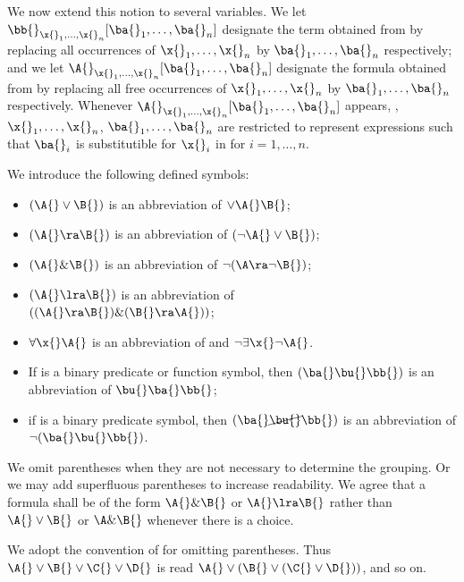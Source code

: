 We now extend this notion to several variables.
We let $\bb{}_{\x{}_1, \dots, \x{}_n} [\ba{}_1, \dots, \ba{}_n]$ designate the term obtained from \bb{} by replacing all occurrences of $\x{}_1, \dots, \x{}_n$ by $\ba{}_1, \dots, \ba{}_n$ respectively;
and we let $\A{}_{\x{}_1, \dots, \x{}_n} [\ba{}_1, \dots, \ba{}_n]$ designate the formula obtained from \A{} by replacing all free occurrences of $\x{}_1, \dots, \x{}_n$ by $\ba{}_1, \dots, \ba{}_n$ respectively.
Whenever $\A{}_{\x{}_1, \dots, \x{}_n} [\ba{}_1, \dots, \ba{}_n]$ appears, \A{}, $\x{}_1, \dots, \x{}_n$, $\ba{}_1, \dots, \ba{}_n$ are restricted to represent expressions such that $\ba{}_i$ is substitutible for $\x{}_i$ in \A{} for $i = 1, \dots, n$.

\begin{shaded*}
    We introduce the following defined symbols:
    \begin{itemize}
        \item $(\A{} \vee \B{})$ is an abbreviation of $\vee \A{} \B{}$;
        \item $(\A{} \ra \B{})$ is an abbreviation of $(\neg \A{} \vee \B{})$;
        \item $(\A{} \& \B{})$ is an abbreviation of $\neg (\A \ra \neg \B{})$;
        \item $(\A{} \lra \B{})$ is an abbreviation of\\$((\A{} \ra \B{}) \& (\B{} \ra \A{}))$;
        \item $\forall \x{} \A{}$ is an abbreviation of and $\neg \exists \x{} \neg \A{}$.
        \item If \bu{} is a binary predicate or function symbol, then $(\ba{} \bu{} \bb{})$ is an abbreviation of $\bu{} \ba{} \bb{}$;
        \item if \bu{} is a binary predicate symbol, then $(\ba{} \cancel{\bu{}} \bb{})$ is an abbreviation of $\neg (\ba{} \bu{} \bb{})$.
    \end{itemize}
\end{shaded*}

\begin{remark}
    We omit parentheses when they are not necessary to determine the grouping.
    Or we may add superfluous parentheses to increase readability.
    We agree that a formula shall be of the form $\A{} \& \B{}$ or $\A{} \lra \B{}$ rather than $\A{} \vee \B{}$ or $\A \& \B{}$ whenever there is a choice.
    
    We adopt the convention of  for omitting parentheses.
    Thus $\A{} \vee \B{} \vee \C{} \vee \D{}$ is read $\A{} \vee (\B{} \vee (\C{} \vee \D{}))$, and so on.
\end{remark}

